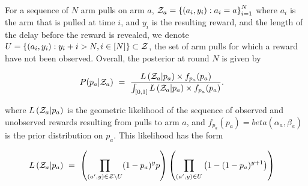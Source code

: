 \documentclass{article}
\begin{document}
For a sequence of $N$ arm pulls on arm $a$, $\mathcal{Z}_a = \left \{ (a_i, y_i) : a_i = a \right \}_{i=1}^N$ where $a_i$ is the arm that is pulled at time $i$, and $y_i$ is the resulting reward, and the length of the delay before the reward is revealed, we denote $U = \left \{ (a_i, y_i) : y_i + i > N, i \in [N] \right \} \subset \mathcal{Z}$, the set of arm pulls for which a reward have not been observed. Overall, the posterior at round $N$ is given by

\begin{align*}
    P(p_a | \mathcal{Z}_a )\ &=\ \frac{L \left( \mathcal{Z}_a | p_a \right) \times f_{p_a}(p_a)}{\int_{[0,1]} L \left( \mathcal{Z}_a | p_a \right) \times f_{p_a}(p_a)} \textnormal{.}
\end{align*}

\noindent where $L \left( \mathcal{Z}_a | p_a \right)$ is the geometric likelihood of the sequence of observed and unobserved rewards resulting from pulls to arm $a$, and $f_{p_a}(p_a) = beta(\alpha_a, \beta_a)$ is the prior distribution on $p_a$. This likelihood has the form

\begin{align*}
	L \left( \mathcal{Z}_a | p_a \right)\ &=\ \left( \prod_{(a', y) \in \mathcal{Z} \setminus U} (1 - p_a)^y p \right) \left( \prod_{(a',y) \in U} \left( 1-(1-p_a)^{y+1} \right) \right)
\end{align*}
\end{document}
